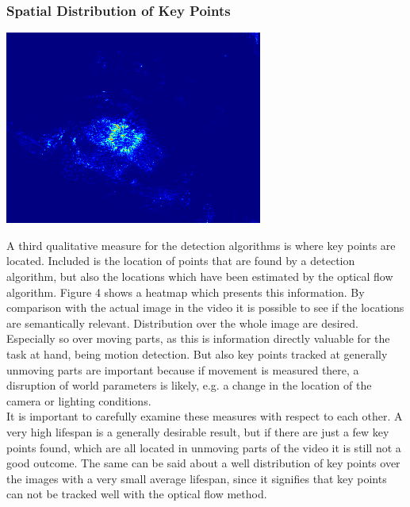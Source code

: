 \documentclass[Bachelorarbeit.tex]{subfiles}
\begin{document}
\subsubsection*{Spatial Distribution of Key Points}
\label{dist}
\begin{center}
	\includegraphics[width=0.5\linewidth]{Images/heatmap_proto}
	\label{heatmap}
\end{center}
A third qualitative measure for the detection algorithms is where key points are located. Included is the location of points that are found by a detection algorithm, but also the locations which have been estimated by the optical flow algorithm. Figure 4 shows a heatmap which presents this information. By comparison with the actual image in the video it is possible to see if the locations are semantically relevant. Distribution over the whole image are desired. Especially so over moving parts, as this is information directly valuable for the task at hand, being motion detection. But also key points tracked at generally unmoving parts are important because if movement is measured there, a disruption of world parameters is likely, e.g. a change in the location of the camera or lighting conditions. 
\\It is important to carefully examine these measures with respect to each other. A very high lifespan is a generally desirable result, but if there are just a few key points found, which are all located in unmoving parts of the video it is still not a good outcome. The same can be said about a well distribution of key points over the images with a very small average lifespan, since it signifies that key points can not be tracked well with the optical flow method.

\end{document}
